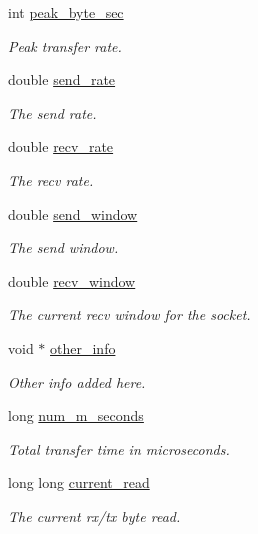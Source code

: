 \begin{DoxyCompactItemize}
int \hyperlink{structtb__prot__stats__t_add34b08d945695cb3234fa3b74d63ab5}{peak\-\_\-byte\-\_\-sec}
\begin{DoxyCompactList}\small\item\em Peak transfer rate. \end{DoxyCompactList}\item 
double \hyperlink{structtb__prot__stats__t_a67477aa01a9beb18e9738c11e847a9fc}{send\-\_\-rate}
\begin{DoxyCompactList}\small\item\em The send rate. \end{DoxyCompactList}\item 
double \hyperlink{structtb__prot__stats__t_aa453b7c484e3457e06bdf4e791bde373}{recv\-\_\-rate}
\begin{DoxyCompactList}\small\item\em The recv rate. \end{DoxyCompactList}\item 
double \hyperlink{structtb__prot__stats__t_ab0aed934e7f36cd46104bd3dd5b14c1d}{send\-\_\-window}
\begin{DoxyCompactList}\small\item\em The send window. \end{DoxyCompactList}\item 
double \hyperlink{structtb__prot__stats__t_a74c7641a53b9b24b7b8941937450b2f5}{recv\-\_\-window}
\begin{DoxyCompactList}\small\item\em The current recv window for the socket. \end{DoxyCompactList}\item 
void $\ast$ \hyperlink{structtb__prot__stats__t_a2c82f234171703c3ce25a507590a05fd}{other\-\_\-info}
\begin{DoxyCompactList}\small\item\em Other info added here. \end{DoxyCompactList}\item 
long \hyperlink{structtb__prot__stats__t_a6222fdae7552d06b315c06a2d778ff46}{num\-\_\-m\-\_\-seconds}
\begin{DoxyCompactList}\small\item\em Total transfer time in microseconds. \end{DoxyCompactList}\item 
long long \hyperlink{structtb__prot__stats__t_a0f29a560900feea0bfd7b1c97e206313}{current\-\_\-read}
\begin{DoxyCompactList}\small\item\em The current rx/tx byte read. \end{DoxyCompactList}\item 

\end{DoxyCompactItemize}
